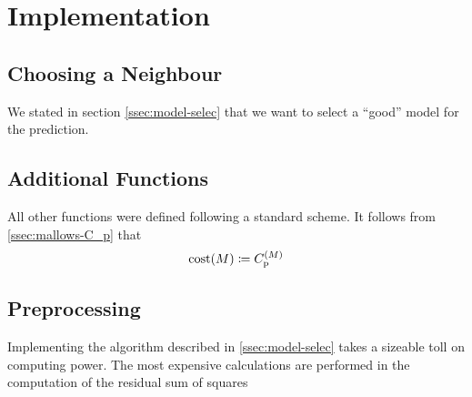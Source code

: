 \section{Implementation}
\label{sec:implementation}
	
	\subsection{Choosing a Neighbour}
	\label{ssec:choosing-a-neighbour}
		
		We stated in section \ref{ssec:model-selec} that we want to select a \enquote{good} model for the prediction.
		
		
	\subsection{Additional Functions}
	\label{ssec:add-func}
	
		All other functions were defined following a standard scheme.
		It follows from \ref{ssec:mallows-C_p} that
		\[
			\mathrm{cost}(M)\coloneqq C_{\mathrm{p}}^{(M)}
		\]
		
	
	\subsection{Preprocessing}
	\label{ssec:preprocessing}
	
		 Implementing the algorithm described in \ref{ssec:model-selec} takes a sizeable toll on computing power.
		 The most expensive calculations are performed in the computation of the residual sum of squares
		 

	
		
